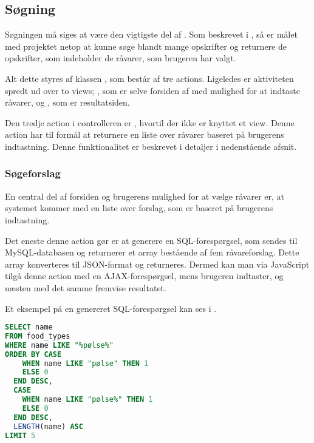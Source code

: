 
\subsection{Søgning}
\label{sec:funktionalitet-soegning}
Søgningen må siges at være den vigtigste del af \Foodl. Som beskrevet i , så er målet med projektet netop at kunne søge blandt mange opskrifter og returnere de opskrifter, som indeholder de råvarer, som brugeren har valgt.

Alt dette styres af klassen , som består af tre actions. Ligeledes er aktiviteten spredt ud over to views; , som er selve forsiden af \Foodl{} med mulighed for at indtaste råvarer, og , som er resultatsiden.

Den tredje action i controlleren er , hvortil der ikke er knyttet et view. Denne action har til formål at returnere en liste over råvarer baseret på brugerens indtastning. Denne funktionalitet er beskrevet i detaljer i nedenstående afsnit.

\subsubsection{Søgeforslag}
En central del af forsiden og brugerens mulighed for at vælge råvarer er, at systemet kommer med en liste over forslag, som er baseret på brugerens indtastning.

Det eneste denne action gør er at generere en SQL-forespørgsel, som sendes til MySQL-databasen og returnerer et array bestående af fem råvareforslag. Dette array konverteres til JSON-format og returneres. Dermed kan man via JavaScript tilgå denne action med en AJAX-forespørgsel, mens brugeren indtaster, og næsten med det samme fremvise resultatet.

Et eksempel på en genereret SQL-forespørgsel kan ses i .

\begin{lstlisting}[caption={Hvis en bruger indtaster ``pølse'' udføres denne SQL-forespørgsel.},label=lst:soegeforslag-sql,language=SQL]
SELECT name
FROM food_types
WHERE name LIKE "%pølse%"
ORDER BY CASE
    WHEN name LIKE "pølse" THEN 1
    ELSE 0
  END DESC,
  CASE
    WHEN name LIKE "pølse%" THEN 1
    ELSE 0
  END DESC,
  LENGTH(name) ASC
LIMIT 5
\end{lstlisting}

